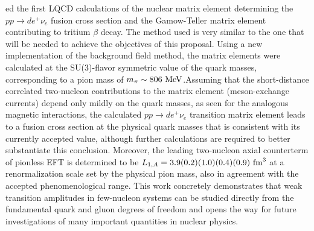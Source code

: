 ed the first LQCD calculations of the nuclear matrix element determining the $pp\rightarrow d e^+\nu_e$ fusion cross section and the Gamow-Teller matrix element contributing to tritium $\beta$ decay. The method used is very similar to the one that will be needed to achieve the objectives of this proposal.
Using a new implementation of the background field method,
the matrix elements were calculated at the SU(3)-flavor symmetric 
value of the quark masses, corresponding to a pion mass of $m_\pi\sim 806~{\rm MeV}$.Assuming that the short-distance correlated two-nucleon contributions to the matrix element 
(meson-exchange currents) depend only mildly on the quark masses, as seen for the analogous magnetic interactions, 
the calculated $pp\rightarrow d e^+\nu_e$ transition matrix element leads to a fusion cross section at the physical quark 
masses that is consistent with its currently accepted value, although further calculations are required to  better substantiate this conclusion. Moreover, the leading two-nucleon axial counterterm of pionless EFT is determined to 
be $L_{1,A} = 3.9(0.2)(1.0)(0.4)(0.9)~{\rm fm}^3$ at a renormalization scale set by the physical pion mass, 
also in agreement with the accepted phenomenological range. 
This work concretely demonstrates that weak transition amplitudes in few-nucleon systems can be studied directly 
from the fundamental quark and gluon degrees of freedom and  
opens the way for future investigations of many important quantities in nuclear physics. 
\cite{Savage:2016kon} 





